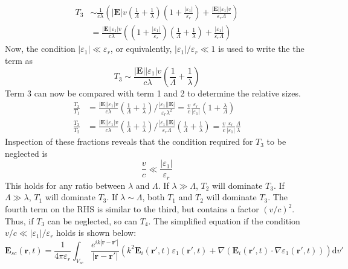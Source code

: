 \documentclass[11pt,twoside]{eitExjobb}
\begin{document}
	\begin{equation*}
	\begin{split}
		T_3 &\sim \frac{1}{c\lambda} \left( |\bm{E}| v \left( \frac{1}{\Lambda} + \frac{1}{\lambda} \right) \left( 1 + \frac{|\varepsilon_1|}{\varepsilon_r} \right) + \frac{|\bm{E}| |\varepsilon_1| v}{\varepsilon_r \Lambda} \right) \\
		&= \frac{|\bm{E}| |\varepsilon_1| v}{c\lambda} \left( \left( 1 + \frac{|\varepsilon_1|}{\varepsilon_r} \right) \left( \frac{1}{\Lambda} + \frac{1}{\lambda} \right) + \frac{|\varepsilon_1|}{\varepsilon_r \Lambda} \right)
	\end{split}
	\end{equation*}
	Now, the condition $|\varepsilon_1| \ll \varepsilon_r$, or equivalently, $|\varepsilon_1|/\varepsilon_r \ll 1$ is used to write the the term as
	\begin{equation*}
		T_3 \sim \frac{|\bm{E}| |\varepsilon_1| v}{c\lambda} \left( \frac{1}{\Lambda} + \frac{1}{\lambda} \right)
	\end{equation*}
	Term 3 can now be compared with term 1 and 2 to determine the relative sizes.
	\begin{align*}
		\frac{T_3}{T_1} &= \frac{|\bm{E}| |\varepsilon_1| v}{c\lambda} \left( \frac{1}{\Lambda} + \frac{1}{\lambda} \right)
		\bigg/
		\frac{|\varepsilon_1| |\bm{E}|}{\varepsilon_r \lambda^2} =
		\frac{v}{c} \frac{\varepsilon_r}{|\varepsilon_1|} \left( 1 + \frac{\lambda}{\Lambda} \right) \\
		\frac{T_3}{T_2} &= \frac{|\bm{E}| |\varepsilon_1| v}{c\lambda} \left( \frac{1}{\Lambda} + \frac{1}{\lambda} \right)
		\bigg/
		\frac{|\varepsilon_1| |\bm{E}|}{\varepsilon_r \Lambda} \left( \frac{1}{\Lambda} + \frac{1}{\lambda} \right) =
		\frac{v}{c} \frac{\varepsilon_r}{|\varepsilon_1|} \frac{\Lambda}{\lambda}
	\end{align*}
	Inspection of these fractions reveals that the condition required for $T_3$ to be neglected is
	\begin{equation*}
		\frac{v}{c} \ll \frac{|\varepsilon_1|}{\varepsilon_r}
	\end{equation*}
	This holds for any ratio between $\lambda$ and $\Lambda$. If $\lambda \gg \Lambda$, $T_2$ will dominate $T_3$. If $\Lambda \gg \lambda$, $T_1$ will dominate $T_3$. If $\lambda \sim \Lambda$, both $T_1$ and $T_2$ will dominate $T_3$. The fourth term on the RHS is similar to the third, but contains a factor $(v/c)^2$. Thus, if $T_3$ can be neglected, so can $T_4$.	The simplified equation if the condition $v/c \ll |\varepsilon_1|/\varepsilon_r$ holds is shown below:
	\begin{equation*}
		\bm{E}_{sc}(\bm{r},t) = \frac{1}{4\pi\varepsilon_r} \int_{V_{sc}} \frac{e^{ik |\bm{r}-\bm{r'}| }}{ |\bm{r}-\bm{r'}|} \left( k^2 \bm{E}_i (\bm{r'},t) \varepsilon_1 (\bm{r'},t) + \nabla (\bm{E}_i (\bm{r'},t) \cdot \nabla \varepsilon_1 (\bm{r'},t)) \right) \mathrm{d}v'
	\end{equation*}
	
\end{document}
